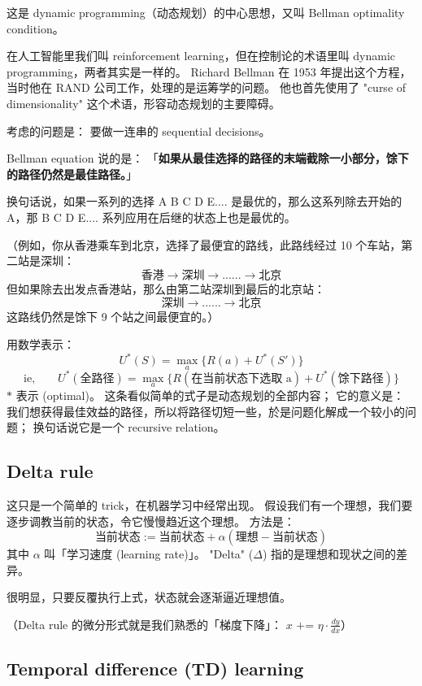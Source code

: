 这是 dynamic programming（动态规划）的中心思想，又叫 Bellman optimality condition。

在人工智能里我们叫 reinforcement learning，但在控制论的术语里叫 dynamic programming，两者其实是一样的。 Richard Bellman 在 1953 年提出这个方程，当时他在 RAND 公司工作，处理的是运筹学的问题。 他也首先使用了 "curse of dimensionality" 这个术语，形容动态规划的主要障碍。

考虑的问题是： 要做一连串的 sequential decisions。

Bellman equation 说的是： 「\textbf{如果从最佳选择的路径的末端截除一小部分，馀下的路径仍然是最佳路径。}」

换句话说，如果一系列的选择 A B C D E.... 是最优的，那么这系列除去开始的 A，那 B C D E.... 系列应用在后继的状态上也是最优的。

（例如，你从香港乘车到北京，选择了最便宜的路线，此路线经过 10 个车站，第二站是深圳：
$$ \mbox{香港} \rightarrow \mbox{深圳} \rightarrow ... ... \rightarrow \mbox{北京} $$
但如果除去出发点香港站，那么由第二站深圳到最后的北京站：
$$ \mbox{深圳} \rightarrow ... ... \rightarrow \mbox{北京} $$
这路线仍然是馀下 9 个站之间最便宜的。）

用数学表示：
$$ U^*(S) = \max_a \{ R(a) + U^*(S') \} $$
$$ \mbox{ie,} \quad \quad U^*(\mbox{全路径}) = \max_a \{ R(\mbox{在当前状态下选取 a}) + U^*(\mbox{馀下路径}) \} $$
$*$ 表示  (optimal)。 这条看似简单的式子是动态规划的全部内容； 它的意义是： 我们想获得最佳效益的路径，所以将路径切短一些，於是问题化解成一个较小的问题；  换句话说它是一个 recursive relation。

\subsection{Delta rule}

这只是一个简单的 trick，在机器学习中经常出现。  假设我们有一个理想，我们要逐步调教当前的状态，令它慢慢趋近这个理想。 方法是： 
$$ \mbox{当前状态} := \mbox{当前状态} + \alpha ( \mbox{理想} - \mbox{当前状态}) $$
其中 $\alpha$ 叫「学习速度 (learning rate)」。 "Delta" ($\Delta$) 指的是理想和现状之间的差异。

很明显，只要反覆执行上式，状态就会逐渐逼近理想值。

（Delta rule 的微分形式就是我们熟悉的「梯度下降」： $x \mbox{ += } \eta \cdot \frac{dy}{dx}$）

\subsection{Temporal difference (TD) learning}

